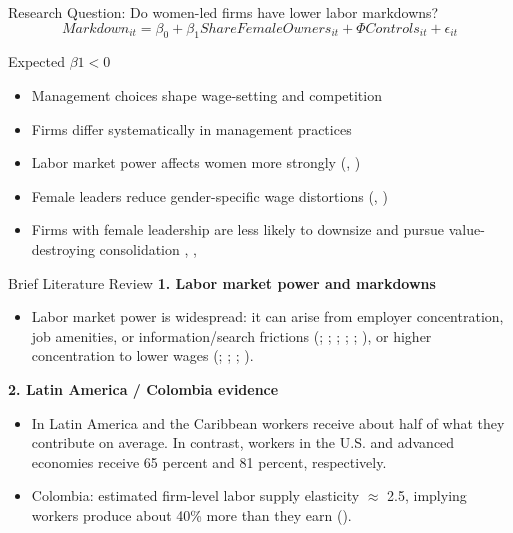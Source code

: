 \documentclass[11pt,aspectratio=169]{beamer}
\begin{document}
\begin{frame}[t]{Research Question: Do women-led firms have lower labor markdowns?}
\vspace{-0.5cm}
\begin{equation}
  Markdown_{it} = \beta_{0} + \beta_{1} ShareFemaleOwners_{it} + \Phi Controls_{it} + \epsilon_{it} 
\end{equation}
\vspace{-0.5cm}
  \begin{block}{Expected $\beta{1}<0$}
    \begin{itemize}
      \item Management choices shape wage-setting and competition \cite{bertrand_is_1998}
      \item Firms differ systematically in management practices \cite{bloom_measuring_2007}
      \item Labor market power affects women more strongly (\cite{hirsch_differences_2010}, \cite{sharma_monopsony_2023})
      \item Female leaders reduce gender-specific wage distortions (\cite{flabbi_female_2017}, \cite{flabbi_female_2019})
      \item Firms with female leadership are less likely to downsize and pursue value-destroying consolidation \cite{matsa_female_2013}, \cite{levi_director_2014}, \cite{matsa_workforce_2014}
    \end{itemize}
  \end{block}
\end{frame}

\begin{frame}[t]{Brief Literature Review}
\textbf{1. Labor market power and markdowns}
\begin{itemize}
  \item Labor market power is widespread: it can arise from employer concentration, job amenities, or information/search frictions  (\cite{manning_elusive_2021}; \cite{card_who_2022}; \cite{azar_minimum_2019}; \cite{manning_monopsony_2013}; \cite{lentz_labor_2010}; \cite{moscarini_unemployment_2010}), or higher concentration to lower wages (\cite{azar_labor_2017}; \cite{azar_minimum_2019}; \cite{benmelech_strong_2018}; \cite{rinz_labor_2022}).
\end{itemize}

\textbf{2. Latin America / Colombia evidence}
\begin{itemize}
  \item In Latin America and the Caribbean workers receive about half of what they contribute on average. In contrast, workers in the U.S. and advanced economies receive 65 percent and 81 percent, respectively.
  \item Colombia: estimated firm-level labor supply elasticity $\approx$ 2.5, implying workers produce about 40\% more than they earn (\cite{amodio_measuring_2024}).
\end{itemize}
\end{frame}
\end{document}
